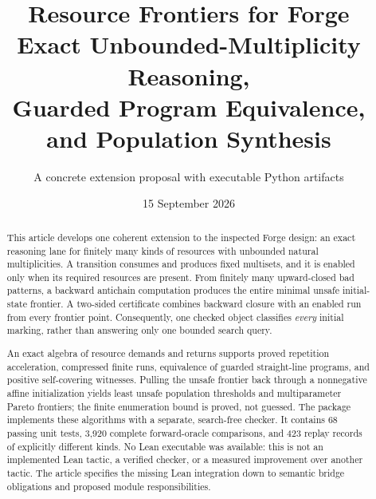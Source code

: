\documentclass[11pt,a4paper]{article}
\title{\vspace{-1em}\textbf{Resource Frontiers for Forge}\\[0.4em]
\large Exact Unbounded-Multiplicity Reasoning,\\Guarded Program Equivalence, and Population Synthesis}
\author{A concrete extension proposal with executable Python artifacts}
\date{15 September 2026}
\theoremstyle{definition}
\theoremstyle{remark}
\begin{document}
\maketitle
\thispagestyle{empty}
\begin{abstract}
This article develops one coherent extension to the inspected Forge design: an exact reasoning lane for finitely many kinds of resources with unbounded natural multiplicities. A transition consumes and produces fixed multisets, and it is enabled only when its required resources are present. From finitely many upward-closed bad patterns, a backward antichain computation produces the entire minimal unsafe initial-state frontier. A two-sided certificate combines backward closure with an enabled run from every frontier point. Consequently, one checked object classifies \emph{every} initial marking, rather than answering only one bounded search query.

An exact algebra of resource demands and returns supports proved repetition acceleration, compressed finite runs, equivalence of guarded straight-line programs, and positive self-covering witnesses. Pulling the unsafe frontier back through a nonnegative affine initialization yields least unsafe population thresholds and multiparameter Pareto frontiers; the finite enumeration bound is proved, not guessed. The package implements these algorithms with a separate, search-free checker. It contains 68 passing unit tests, 3,920 complete forward-oracle comparisons, and 423 replay records of explicitly different kinds. No Lean executable was available: this is not an implemented Lean tactic, a verified checker, or a measured improvement over another tactic. The article specifies the missing Lean integration down to semantic bridge obligations and proposed module responsibilities.
\end{abstract}
\vspace{0.6em}
\noindent{}
\clearpage
\tableofcontents
\clearpage
\end{document}
